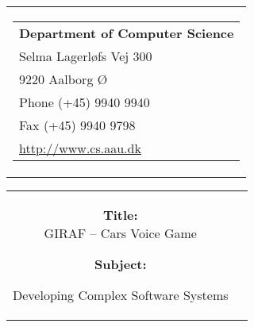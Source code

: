\thispagestyle{empty}
\begin{titlepage}
\begin{nopagebreak}
{\samepage 
\begin{tabular}{r}
	\parbox{16cm}{
	\hfill \parbox{7cm}{\begin{tabular}{l}
		{\small \textbf{Department of Computer Science}}\\
		{\small Selma Lagerløfs Vej 300} \\
		{\small 9220 Aalborg Ø} \\
		{\small Phone (+45) 9940 9940} \\
		{\small Fax (+45) 9940 9798} \\
		{\small \url{http://www.cs.aau.dk}}
	\end{tabular}}
	}
\end{tabular}

\begin{tabular}{cc}
	\parbox{8cm}{
	\begin{description}
		\item { \textbf{Title:}}\\ 
			GIRAF -- Cars Voice Game
    		\item { \textbf{Subject:}}\\ 
			\raggedright Developing Complex Software Systems
	\end{description}
	
}
\end{tabular}}
\end{nopagebreak}
\end{titlepage}
